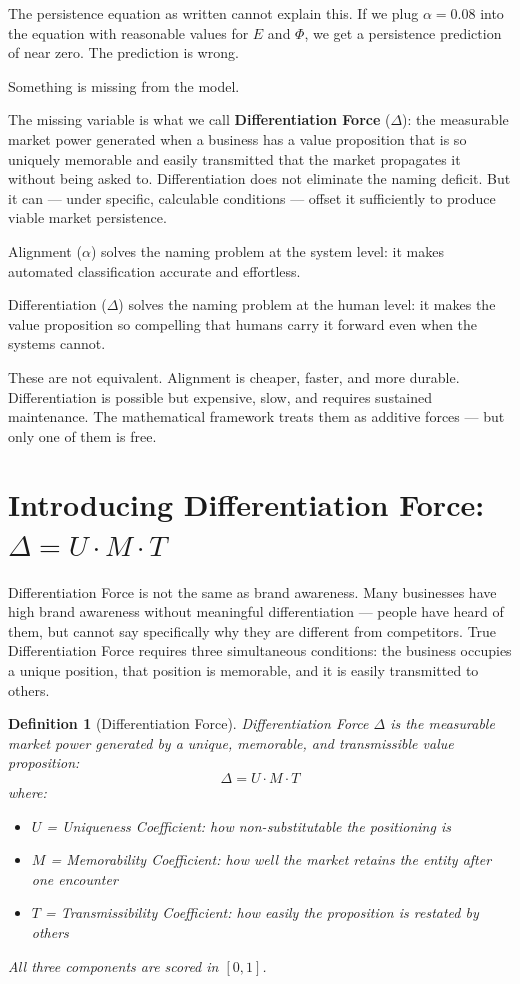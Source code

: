 \documentclass[12pt, openany]{book}
\theoremstyle{thmstyle}
\theoremstyle{defstyle}
\newtheorem{definition}{Definition}[chapter]
\begin{document}
The persistence equation as written cannot explain this. If we plug $\alpha = 0.08$ into the equation with reasonable values for $E$ and $\Phi$, we get a persistence prediction of near zero. The prediction is wrong.

Something is missing from the model.

The missing variable is what we call \textbf{Differentiation Force} ($\Delta$): the measurable market power generated when a business has a value proposition that is so uniquely memorable and easily transmitted that the market propagates it without being asked to. Differentiation does not eliminate the naming deficit. But it can --- under specific, calculable conditions --- offset it sufficiently to produce viable market persistence.

\begin{keybox}
Alignment ($\alpha$) solves the naming problem at the system level: it makes automated classification accurate and effortless.

Differentiation ($\Delta$) solves the naming problem at the human level: it makes the value proposition so compelling that humans carry it forward even when the systems cannot.

These are not equivalent. Alignment is cheaper, faster, and more durable. Differentiation is possible but expensive, slow, and requires sustained maintenance. The mathematical framework treats them as additive forces --- but only one of them is free.
\end{keybox}

\section{Introducing Differentiation Force: $\Delta = U \cdot M \cdot T$}

Differentiation Force is not the same as brand awareness. Many businesses have high brand awareness without meaningful differentiation --- people have heard of them, but cannot say specifically why they are different from competitors. True Differentiation Force requires three simultaneous conditions: the business occupies a unique position, that position is memorable, and it is easily transmitted to others.

\begin{definition}[Differentiation Force]
Differentiation Force $\Delta$ is the measurable market power generated by a unique, memorable, and transmissible value proposition:
\begin{equation}
\Delta = U \cdot M \cdot T
\label{eq:delta}
\end{equation}
where:
\begin{itemize}[leftmargin=1.5em]
  \item $U$ = Uniqueness Coefficient: how non-substitutable the positioning is
  \item $M$ = Memorability Coefficient: how well the market retains the entity after one encounter
  \item $T$ = Transmissibility Coefficient: how easily the proposition is restated by others
\end{itemize}
All three components are scored in $[0, 1]$.
\end{definition}
\end{document}
